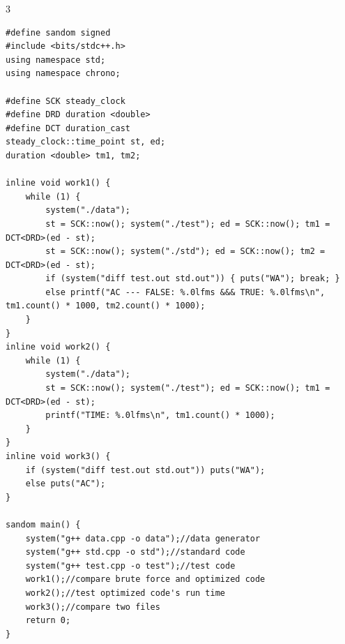 \documentclass[8pt]{extarticle}
\begin{document}
\begin{multicols*}{3}
\begin{lstlisting}
#define sandom signed
#include <bits/stdc++.h>
using namespace std;
using namespace chrono;

#define SCK steady_clock
#define DRD duration <double>
#define DCT duration_cast
steady_clock::time_point st, ed;
duration <double> tm1, tm2;

inline void work1() {
    while (1) {
        system("./data");
        st = SCK::now(); system("./test"); ed = SCK::now(); tm1 = DCT<DRD>(ed - st);
        st = SCK::now(); system("./std"); ed = SCK::now(); tm2 = DCT<DRD>(ed - st);
        if (system("diff test.out std.out")) { puts("WA"); break; }
        else printf("AC --- FALSE: %.0lfms &&& TRUE: %.0lfms\n", tm1.count() * 1000, tm2.count() * 1000);
    }
}
inline void work2() {
    while (1) {
        system("./data");
        st = SCK::now(); system("./test"); ed = SCK::now(); tm1 = DCT<DRD>(ed - st);
        printf("TIME: %.0lfms\n", tm1.count() * 1000);
    }
}
inline void work3() {
    if (system("diff test.out std.out")) puts("WA");
    else puts("AC");
}

sandom main() {
    system("g++ data.cpp -o data");//data generator
    system("g++ std.cpp -o std");//standard code
    system("g++ test.cpp -o test");//test code
    work1();//compare brute force and optimized code
    work2();//test optimized code's run time
    work3();//compare two files
    return 0;
}
\end{lstlisting}

\end{multicols*}
\end{document}
